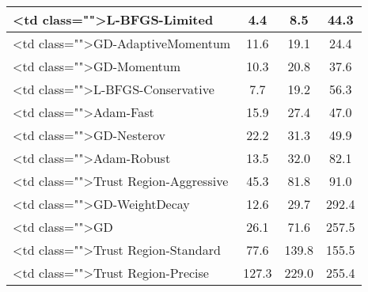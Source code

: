\documentclass{article}
\begin{document}
\begin{tabular}{|l|c|c|c|}
                <td class="">L-BFGS-Limited & 
                4.4 & 
                8.5 & 
                44.3 & 
             \\
\hline
            
                <td class="">GD-AdaptiveMomentum & 
                11.6 & 
                19.1 & 
                24.4 & 
             \\
\hline
            
                <td class="">GD-Momentum & 
                10.3 & 
                20.8 & 
                37.6 & 
             \\
\hline
            
                <td class="">L-BFGS-Conservative & 
                7.7 & 
                19.2 & 
                56.3 & 
             \\
\hline
            
                <td class="">Adam-Fast & 
                15.9 & 
                27.4 & 
                47.0 & 
             \\
\hline
            
                <td class="">GD-Nesterov & 
                22.2 & 
                31.3 & 
                49.9 & 
             \\
\hline
            
                <td class="">Adam-Robust & 
                13.5 & 
                32.0 & 
                82.1 & 
             \\
\hline
            
                <td class="">Trust Region-Aggressive & 
                45.3 & 
                81.8 & 
                91.0 & 
             \\
\hline
            
                <td class="">GD-WeightDecay & 
                12.6 & 
                29.7 & 
                292.4 & 
             \\
\hline
            
                <td class="">GD & 
                26.1 & 
                71.6 & 
                257.5 & 
             \\
\hline
            
                <td class="">Trust Region-Standard & 
                77.6 & 
                139.8 & 
                155.5 & 
             \\
\hline
            
                <td class="">Trust Region-Precise & 
                127.3 & 
                229.0 & 
                255.4 & 
             \\
\hline
            

\end{tabular}
\end{document}
